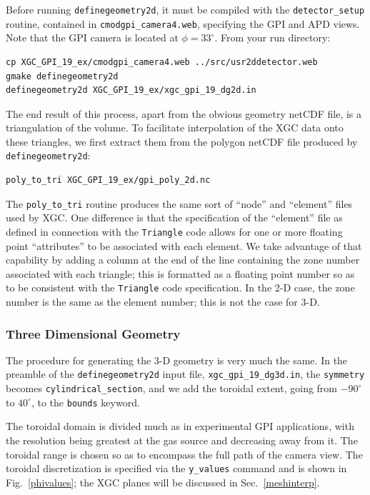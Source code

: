 \documentclass[12pt]{report}
\begin{document}
Before running {\tt definegeometry2d}, it must be compiled with the
{\tt detector\_setup} routine, contained in
{\tt cmodgpi\_camera4.web}, specifying the GPI and APD views.
Note that the GPI camera is located
at $\phi = 33^{\circ}$.  From your
run directory:

\begin{verbatim}
cp XGC_GPI_19_ex/cmodgpi_camera4.web ../src/usr2ddetector.web
gmake definegeometry2d
definegeometry2d XGC_GPI_19_ex/xgc_gpi_19_dg2d.in
\end{verbatim}

The end result of this process, apart from the obvious geometry
netCDF file, is a triangulation of the volume.  To facilitate
interpolation of the XGC data onto these triangles, we first
extract them from the polygon netCDF file produced by {\tt definegeometry2d}:

\begin{verbatim}
poly_to_tri XGC_GPI_19_ex/gpi_poly_2d.nc
\end{verbatim}

The {\tt poly\_to\_tri} routine produces the same
sort of ``node'' and ``element'' files
used by XGC.  One difference is that the specification of the
``element'' file as defined in connection with the {\tt Triangle} code
allows for one or more floating point ``attributes'' to be associated
with each element.  We take advantage of that capability by adding a column
at the end of the line containing the zone number associated with each
triangle; this is formatted as a floating point number so as to be
consistent with the {\tt Triangle} code specification.  In the 2-D case,
the zone number is the same as the element number; this is not the
case for 3-D.

\subsubsection{Three Dimensional Geometry}
\label{3D}

The procedure for generating the 3-D geometry is very much the same.
In the preamble of the
{\tt definegeometry2d} input file, {\tt xgc\_gpi\_19\_dg3d.in},
the {\tt symmetry} becomes {\tt cylindrical\_section}, and
we add the toroidal
extent, going from $-90^{\circ}$ to $40^{\circ}$, to the
{\tt bounds} keyword.

The toroidal domain is divided much as in experimental GPI
applications, with the resolution being greatest at the gas source and
decreasing away from it.
The toroidal range is chosen so as to encompass
the full path of the camera view. The toroidal
discretization is specified via the
{\tt y\_values} command and is shown in Fig.~\ref{phivalues}; the XGC
planes will be discussed in Sec.~\ref{meshinterp}.
\end{document}
